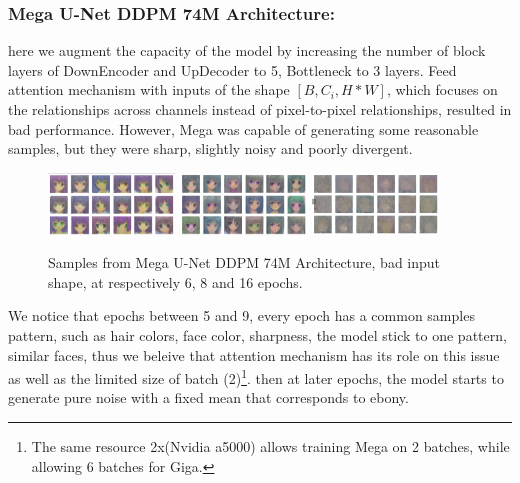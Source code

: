 \documentclass[twocolumn,superscriptaddress,aps]{revtex4-1}
\begin{document}
\subsubsection{Mega U-Net DDPM 74M Architecture:}
here we augment the capacity of the model by increasing the number of block layers of DownEncoder and UpDecoder to 5, Bottleneck to 3 layers.
Feed attention mechanism with inputs of the shape $[B, C_i, H*W]$, which focuses on the relationships across channels instead of pixel-to-pixel relationships, resulted in bad performance. However, Mega was capable of generating some reasonable samples, but they were sharp, slightly noisy and poorly divergent.
\begin{figure}[H]
    \centering
    \includegraphics[width=0.3\textwidth]{figures/Screenshot from 2025-08-06 17-12-05.png}
    \includegraphics[width=0.3\textwidth]{figures/Screenshot from 2025-08-06 20-09-30.png}
    \includegraphics[width=0.3\textwidth]{figures/74M-badattention-epoch16.png}
    \caption{Samples from Mega U-Net DDPM 74M Architecture, bad input shape, at respectively 6, 8 and 16 epochs.}
\end{figure}


We notice that epochs between 5 and 9, every epoch has a common samples pattern, such as hair colors, face color, sharpness, the model stick to one pattern, similar faces, thus we beleive that attention mechanism has its role on this issue as well as the limited size of batch (2)\footnote{The same resource 2x(Nvidia a5000) allows training Mega on 2 batches, while allowing 6 batches for Giga.}.
then at later epochs, the model starts to generate pure noise with a fixed mean that corresponds to ebony.
\end{document}
